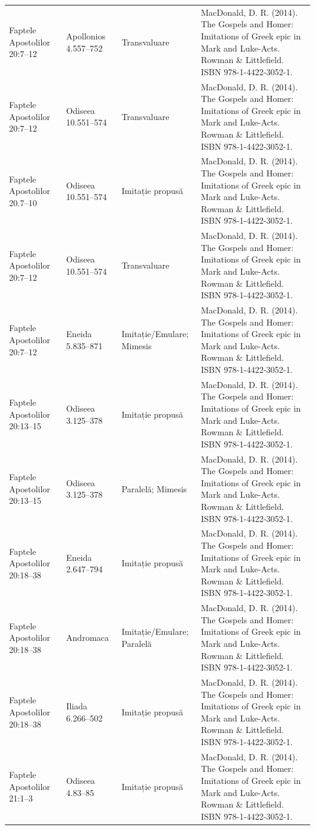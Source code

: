 \documentclass[12pt,a4paper,twoside,openany]{book}
\begin{document}
\begin{longtable}{L{1.4cm}L{1.7cm}L{3.1cm}L{8.4cm}}
Faptele Apostolilor 20:7–12 & Apollonios 4.557–752 & Transvaluare & MacDonald, D. R. (2014). The Gospels and Homer: Imitations of Greek epic in Mark and Luke-Acts. Rowman \& Littlefield. ISBN 978-1-4422-3052-1. \\
Faptele Apostolilor 20:7–12 & Odiseea 10.551–574 & Transvaluare & MacDonald, D. R. (2014). The Gospels and Homer: Imitations of Greek epic in Mark and Luke-Acts. Rowman \& Littlefield. ISBN 978-1-4422-3052-1. \\
Faptele Apostolilor 20.7–10 & Odiseea 10.551–574 & Imitație propusă & MacDonald, D. R. (2014). The Gospels and Homer: Imitations of Greek epic in Mark and Luke-Acts. Rowman \& Littlefield. ISBN 978-1-4422-3052-1. \\
Faptele Apostolilor 20:7–12 & Odiseea 10.551–574 & Transvaluare & MacDonald, D. R. (2014). The Gospels and Homer: Imitations of Greek epic in Mark and Luke-Acts. Rowman \& Littlefield. ISBN 978-1-4422-3052-1. \\
Faptele Apostolilor 20:7–12 & Eneida 5.835–871 & Imitație/Emulare; Mimesis & MacDonald, D. R. (2014). The Gospels and Homer: Imitations of Greek epic in Mark and Luke-Acts. Rowman \& Littlefield. ISBN 978-1-4422-3052-1. \\
Faptele Apostolilor 20:13–15 & Odiseea 3.125–378 & Imitație propusă & MacDonald, D. R. (2014). The Gospels and Homer: Imitations of Greek epic in Mark and Luke-Acts. Rowman \& Littlefield. ISBN 978-1-4422-3052-1. \\
Faptele Apostolilor 20:13–15 & Odiseea 3.125–378 & Paralelă; Mimesis & MacDonald, D. R. (2014). The Gospels and Homer: Imitations of Greek epic in Mark and Luke-Acts. Rowman \& Littlefield. ISBN 978-1-4422-3052-1. \\
Faptele Apostolilor 20:18–38 & Eneida 2.647–794 & Imitație propusă & MacDonald, D. R. (2014). The Gospels and Homer: Imitations of Greek epic in Mark and Luke-Acts. Rowman \& Littlefield. ISBN 978-1-4422-3052-1. \\
Faptele Apostolilor 20:18–38 & Andromaca & Imitație/Emulare; Paralelă & MacDonald, D. R. (2014). The Gospels and Homer: Imitations of Greek epic in Mark and Luke-Acts. Rowman \& Littlefield. ISBN 978-1-4422-3052-1. \\
Faptele Apostolilor 20:18–38 & Iliada 6.266–502 & Imitație propusă & MacDonald, D. R. (2014). The Gospels and Homer: Imitations of Greek epic in Mark and Luke-Acts. Rowman \& Littlefield. ISBN 978-1-4422-3052-1. \\
Faptele Apostolilor 21:1–3 & Odiseea 4.83–85 & Imitație propusă & MacDonald, D. R. (2014). The Gospels and Homer: Imitations of Greek epic in Mark and Luke-Acts. Rowman \& Littlefield. ISBN 978-1-4422-3052-1. \\

\end{longtable}
\end{document}
